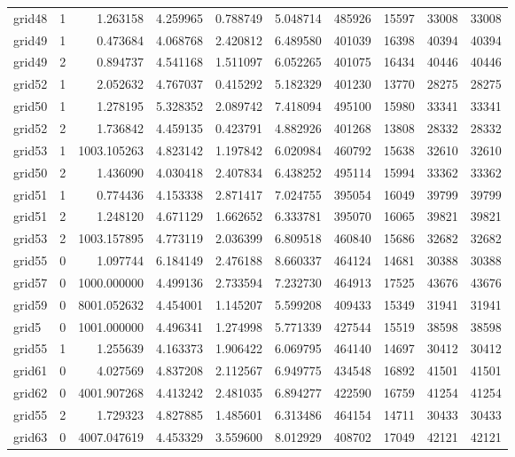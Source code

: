 \begin{longtable}{|l|r|r|r|r|r|r|r|r|r|}
grid48 & 1 & 1.263158 & 4.259965 & 0.788749 & 5.048714 & 485926 & 15597 & 33008 & 33008 \\
grid49 & 1 & 0.473684 & 4.068768 & 2.420812 & 6.489580 & 401039 & 16398 & 40394 & 40394 \\
grid49 & 2 & 0.894737 & 4.541168 & 1.511097 & 6.052265 & 401075 & 16434 & 40446 & 40446 \\
grid52 & 1 & 2.052632 & 4.767037 & 0.415292 & 5.182329 & 401230 & 13770 & 28275 & 28275 \\
grid50 & 1 & 1.278195 & 5.328352 & 2.089742 & 7.418094 & 495100 & 15980 & 33341 & 33341 \\
grid52 & 2 & 1.736842 & 4.459135 & 0.423791 & 4.882926 & 401268 & 13808 & 28332 & 28332 \\
grid53 & 1 & 1003.105263 & 4.823142 & 1.197842 & 6.020984 & 460792 & 15638 & 32610 & 32610 \\
grid50 & 2 & 1.436090 & 4.030418 & 2.407834 & 6.438252 & 495114 & 15994 & 33362 & 33362 \\
grid51 & 1 & 0.774436 & 4.153338 & 2.871417 & 7.024755 & 395054 & 16049 & 39799 & 39799 \\
grid51 & 2 & 1.248120 & 4.671129 & 1.662652 & 6.333781 & 395070 & 16065 & 39821 & 39821 \\
grid53 & 2 & 1003.157895 & 4.773119 & 2.036399 & 6.809518 & 460840 & 15686 & 32682 & 32682 \\
grid55 & 0 & 1.097744 & 6.184149 & 2.476188 & 8.660337 & 464124 & 14681 & 30388 & 30388 \\
grid57 & 0 & 1000.000000 & 4.499136 & 2.733594 & 7.232730 & 464913 & 17525 & 43676 & 43676 \\
grid59 & 0 & 8001.052632 & 4.454001 & 1.145207 & 5.599208 & 409433 & 15349 & 31941 & 31941 \\
grid5 & 0 & 1001.000000 & 4.496341 & 1.274998 & 5.771339 & 427544 & 15519 & 38598 & 38598 \\
grid55 & 1 & 1.255639 & 4.163373 & 1.906422 & 6.069795 & 464140 & 14697 & 30412 & 30412 \\
grid61 & 0 & 4.027569 & 4.837208 & 2.112567 & 6.949775 & 434548 & 16892 & 41501 & 41501 \\
grid62 & 0 & 4001.907268 & 4.413242 & 2.481035 & 6.894277 & 422590 & 16759 & 41254 & 41254 \\
grid55 & 2 & 1.729323 & 4.827885 & 1.485601 & 6.313486 & 464154 & 14711 & 30433 & 30433 \\
grid63 & 0 & 4007.047619 & 4.453329 & 3.559600 & 8.012929 & 408702 & 17049 & 42121 & 42121 \\

\end{longtable}
